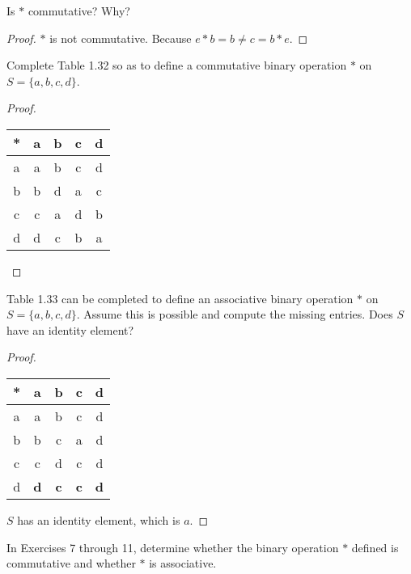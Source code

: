 \newpage
\begin{exercise}
    Is $*$ commutative? Why?
\end{exercise}

\begin{proof}
    $*$ is not commutative. Because $e * b = b \ne c = b * e$.
\end{proof}

\newpage
\begin{exercise}
    Complete Table 1.32 so as to define a commutative binary operation $*$ on $S = \{ a, b, c, d \}$.
\end{exercise}

\begin{proof}
    \begin{tabular}{c|c|c|c|c}
        * & a & b & c & d \\
        \midrule
        a & a & b & c & d \\
        b & b & d & a & c \\
        c & c & a & d & b \\
        d & d & c & b & a
    \end{tabular}
\end{proof}

\newpage
\begin{exercise}
    Table 1.33 can be completed to define an associative binary operation $*$ on $S = \{ a, b, c, d \}$. Assume this is possible and compute the missing entries. Does $S$ have an identity element?
\end{exercise}

\begin{proof}
    \begin{tabular}{c|c|c|c|c}
        * & a          & b          & c          & d          \\
        \hline
        a & a          & b          & c          & d          \\
        b & b          & c          & a          & d          \\
        c & c          & d          & c          & d          \\
        d & \textbf{d} & \textbf{c} & \textbf{c} & \textbf{d}
    \end{tabular}

    $S$ has an identity element, which is $a$.
\end{proof}

In Exercises 7 through 11, determine whether the binary operation $*$ defined is commutative and whether $*$ is associative.

